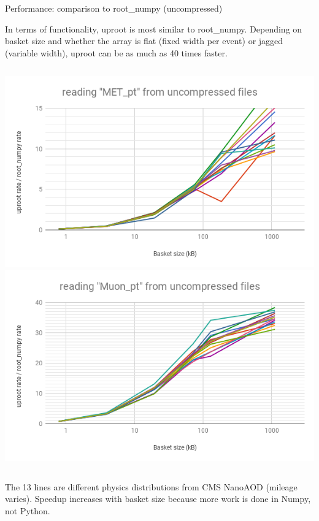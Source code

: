 \documentclass[aspectratio=169]{beamer}
\begin{document}
\begin{frame}{Performance: comparison to root\_numpy (uncompressed)}
\vspace{0.4 cm}

In terms of functionality, uproot is most similar to root\_numpy. Depending on basket size and whether the array is flat (fixed width per event) or jagged (variable width), uproot can be as much as 40 times faster.

\begin{columns}
\includegraphics[width=0.5\linewidth]{rootnumpy-none-met.png}
\includegraphics[width=0.5\linewidth]{rootnumpy-none-muon.png}
\end{columns}

The 13 lines are different physics distributions from CMS NanoAOD (mileage varies). Speedup increases with basket size because more work is done in Numpy, not Python.
\end{frame}
\end{document}
